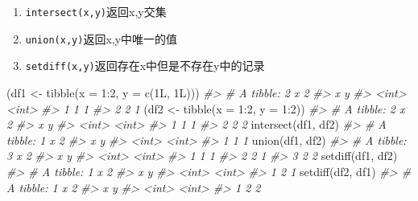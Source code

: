 \documentclass[
]{book}
\newenvironment{Shaded}{\begin{snugshade}}{\end{snugshade}}
\newcommand{\AttributeTok}[1]{\textcolor[rgb]{0.77,0.63,0.00}{#1}}
\newcommand{\CommentTok}[1]{\textcolor[rgb]{0.56,0.35,0.01}{\textit{#1}}}
\newcommand{\DecValTok}[1]{\textcolor[rgb]{0.00,0.00,0.81}{#1}}
\newcommand{\FunctionTok}[1]{\textcolor[rgb]{0.00,0.00,0.00}{#1}}
\newcommand{\NormalTok}[1]{#1}
\newcommand{\OtherTok}[1]{\textcolor[rgb]{0.56,0.35,0.01}{#1}}
\newcommand{\SpecialCharTok}[1]{\textcolor[rgb]{0.00,0.00,0.00}{#1}}
\begin{document}
\begin{enumerate}
\def\labelenumi{\arabic{enumi}.}
\item
  \texttt{intersect(x,y)}返回x,y交集
\item
  \texttt{union(x,y)}返回x,y中唯一的值
\item
  \texttt{setdiff(x,y)}返回存在x中但是不存在y中的记录
\end{enumerate}

\begin{Shaded}
\begin{Highlighting}[]
\NormalTok{(df1 }\OtherTok{\textless{}{-}} \FunctionTok{tibble}\NormalTok{(}\AttributeTok{x =} \DecValTok{1}\SpecialCharTok{:}\DecValTok{2}\NormalTok{, }\AttributeTok{y =} \FunctionTok{c}\NormalTok{(1L, 1L)))}
\CommentTok{\#\textgreater{} \# A tibble: 2 x 2}
\CommentTok{\#\textgreater{}       x     y}
\CommentTok{\#\textgreater{}   \textless{}int\textgreater{} \textless{}int\textgreater{}}
\CommentTok{\#\textgreater{} 1     1     1}
\CommentTok{\#\textgreater{} 2     2     1}
\NormalTok{(df2 }\OtherTok{\textless{}{-}} \FunctionTok{tibble}\NormalTok{(}\AttributeTok{x =} \DecValTok{1}\SpecialCharTok{:}\DecValTok{2}\NormalTok{, }\AttributeTok{y =} \DecValTok{1}\SpecialCharTok{:}\DecValTok{2}\NormalTok{))}
\CommentTok{\#\textgreater{} \# A tibble: 2 x 2}
\CommentTok{\#\textgreater{}       x     y}
\CommentTok{\#\textgreater{}   \textless{}int\textgreater{} \textless{}int\textgreater{}}
\CommentTok{\#\textgreater{} 1     1     1}
\CommentTok{\#\textgreater{} 2     2     2}
\FunctionTok{intersect}\NormalTok{(df1, df2)}
\CommentTok{\#\textgreater{} \# A tibble: 1 x 2}
\CommentTok{\#\textgreater{}       x     y}
\CommentTok{\#\textgreater{}   \textless{}int\textgreater{} \textless{}int\textgreater{}}
\CommentTok{\#\textgreater{} 1     1     1}
\FunctionTok{union}\NormalTok{(df1, df2)}
\CommentTok{\#\textgreater{} \# A tibble: 3 x 2}
\CommentTok{\#\textgreater{}       x     y}
\CommentTok{\#\textgreater{}   \textless{}int\textgreater{} \textless{}int\textgreater{}}
\CommentTok{\#\textgreater{} 1     1     1}
\CommentTok{\#\textgreater{} 2     2     1}
\CommentTok{\#\textgreater{} 3     2     2}
\FunctionTok{setdiff}\NormalTok{(df1, df2)}
\CommentTok{\#\textgreater{} \# A tibble: 1 x 2}
\CommentTok{\#\textgreater{}       x     y}
\CommentTok{\#\textgreater{}   \textless{}int\textgreater{} \textless{}int\textgreater{}}
\CommentTok{\#\textgreater{} 1     2     1}
\FunctionTok{setdiff}\NormalTok{(df2, df1)}
\CommentTok{\#\textgreater{} \# A tibble: 1 x 2}
\CommentTok{\#\textgreater{}       x     y}
\CommentTok{\#\textgreater{}   \textless{}int\textgreater{} \textless{}int\textgreater{}}
\CommentTok{\#\textgreater{} 1     2     2}
\end{Highlighting}
\end{Shaded}
\end{document}

